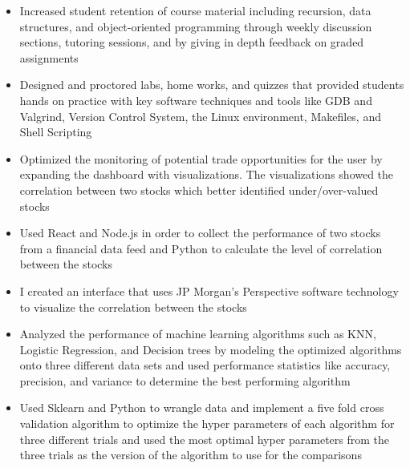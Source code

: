 \documentclass[10pt,a4paper,ragged2e,withhyper]{altacv}
\begin{document}
\begin{paracol}{2}

\begin{itemize}
\item Increased student retention of course material including recursion, data structures, and object-oriented programming through weekly discussion sections, tutoring sessions, and by giving in depth feedback on graded assignments

\item Designed and proctored labs, home works, and quizzes that provided students hands on practice with key software techniques and tools like GDB and Valgrind, Version Control System, the Linux environment, Makefiles, and Shell Scripting 

\end{itemize}

\divider

\begin{itemize}
\item Optimized the monitoring of potential trade opportunities for the user by expanding the dashboard with visualizations. The visualizations showed the correlation between two stocks which better identified under/over-valued stocks

\item Used React and Node.js in order to collect the performance of two stocks from a financial data feed and Python to calculate the level of correlation between the stocks
\item I created an interface that uses  JP Morgan’s Perspective software technology to visualize the correlation between the stocks

\end{itemize}


\begin{itemize}
\item Analyzed the performance of machine learning algorithms such as KNN, Logistic Regression, and Decision trees by modeling the optimized algorithms onto three different data sets and used performance statistics like accuracy, precision, and variance to determine the best performing algorithm
\item Used Sklearn and Python to wrangle data and implement a five fold cross validation algorithm to optimize the hyper parameters of each algorithm for three different trials and used the most optimal hyper parameters from the three trials as the version of the algorithm to use for the comparisons
\end{itemize}


\end{paracol}
\end{document}

